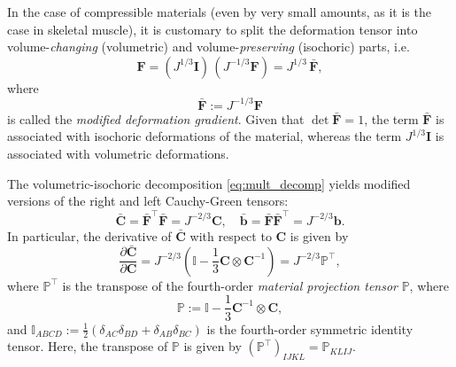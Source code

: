 \documentclass{sfuthesis}
\numberwithin{equation}{section}
\numberwithin{figure}{chapter}
\numberwithin{table}{chapter}
\theoremstyle{definition}
\def\*#1{{\mathbf{#1}}} %
\newcommand{\pder}[2]{\dfrac{\partial #1}{\partial #2}}
\newcommand{\T}{\top}
\renewcommand{\P}{\mathbb{P}}
\begin{document}
In the case of compressible materials (even by very small amounts, as it is the case in skeletal muscle), it is customary to split the deformation tensor into volume-\textit{changing} (volumetric) and volume-\textit{preserving} (isochoric) parts, i.e.
\begin{equation} \label{eq:mult_decomp}
\*F = (J^{1/3} \*I)  \, (J^{-1/3} \*F) = J^{1/3} \, \bar{\*F},
\end{equation}
where
\begin{equation}
    \bar{\*F} := J^{-1/3} \*F
\end{equation}
is called the \textit{modified deformation gradient}. Given that $\det\bar{\*F} = 1$, the term $\bar{\*F}$ is associated with isochoric deformations of the material, whereas the term $J^{1/3}\*I$ is associated with volumetric deformations.

The volumetric-isochoric decomposition \eqref{eq:mult_decomp} yields modified versions of the right and left Cauchy-Green tensors:
\begin{equation}
\bar{\*C} = \bar{\*F}^\T \bar{\*F} = J^{-2/3} \*C, \quad \bar{\*b} = \bar{\*F} \bar{\*F}^\T = J^{-2/3} \*b.
\end{equation}
In particular, the derivative of $\bar{\*C}$ with respect to $\*C$ is given by
\begin{equation} \label{eq:der_cbar_c}
\pder{\bar{\*C}}{\*C} = J^{-2/3} \left( \mathbb{I} - \dfrac{1}{3}\*C \otimes \*C^{-1} \right) = J^{-2/3} \P^\T,
\end{equation}
where $\P^\T$ is the transpose of the fourth-order \textit{material projection tensor} $\P$, where 
\begin{equation} \label{eq:def_projection_material}
\P := \mathbb{I} - \dfrac{1}{3}\*C^{-1} \otimes \*C,
\end{equation}
and $\mathbb{I}_{ABCD} := \frac{1}{2} \left( \delta_{AC} \delta_{BD} + \delta_{AB} \delta_{BC} \right)$ is the fourth-order symmetric identity tensor. Here, the transpose of $\P$ is given by $(\P^\top)_{IJKL} = \P_{KLIJ}$.
\end{document}

